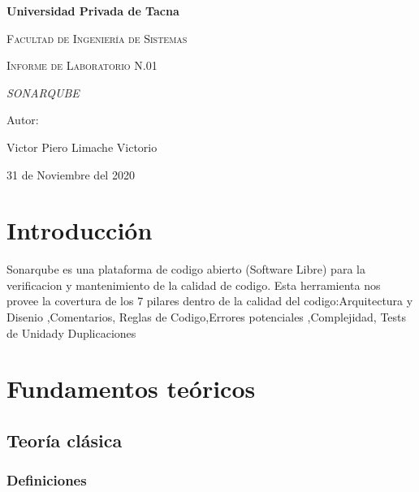 \documentclass{report}
\begin{document}
	\begin{titlepage}
		\centering
		{\bfseries\LARGE Universidad Privada de Tacna \par}
		\vspace{1cm}
		{\scshape\LARGE Facultad de Ingenier\'ia de Sistemas \par}
		\vspace{3cm}
		{\scshape\Huge Informe de Laboratorio N.01 \par}
		\vspace{2cm}
		{\itshape\Large SONARQUBE  \par}
		\vfill
		{\Large Autor: \par}
		{\Large Victor Piero Limache Victorio \par}
		\vfill
		{\Large 31 de Noviembre del 2020 \par}
	\end{titlepage}


	\tableofcontents
	\chapter{Introducción}
	
Sonarqube es una plataforma de codigo abierto (Software Libre) para la verificacion y mantenimiento de la calidad de codigo. Esta herramienta nos provee la covertura de los 7 pilares dentro de la calidad del codigo:Arquitectura y Disenio ,Comentarios, Reglas de Codigo,Errores potenciales ,Complejidad, Tests de Unidady Duplicaciones
\\


	\chapter{Fundamentos teóricos}
	
	\section{Teoría clásica}
	
	\subsection{Definiciones}
	
\end{document}
